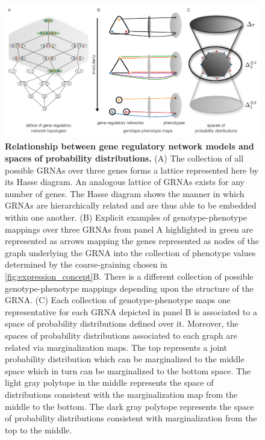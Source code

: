 \begin{figure}[!ht]
\centering
\noindent\includegraphics[width=0.9\columnwidth]{fig/conediagram.pdf}
\caption{{\bf Relationship between gene regulatory network models and spaces of probability distributions.} (A) The collection of all possible GRNAs over three genes forms a lattice represented here by its Hasse diagram. An analogous lattice of GRNAs exists for any number of genes. The Hasse diagram shows the manner in which GRNAs are hierarchically related and are thus able to be embedded within one another. (B) Explicit examples of genotype-phenotype mappings over three GRNAs from panel A highlighted in green are represented as arrows mapping the genes represented as nodes of the graph underlying the GRNA into the collection of phenotype values determined by the coarse-graining chosen in \ref{fig:expression_concept}B. There is a different collection of possible genotype-phenotype mappings depending upon the structure of the GRNA. (C) Each collection of genotype-phenotype maps one representative for each GRNA depicted in panel B is associated to a space of probability distributions defined over it. Moreover, the spaces of probability distributions associated to each graph are related via marginalization maps. The top represents a joint probability distribution which can be marginalized to the middle space which in turn can be marginalized to the bottom space. The light gray polytope in the middle represents the space of distributions consistent with the marginalization map from the middle to the bottom. The dark gray polytope represents the space of probability distributions consistent with marginalization from the top to the middle.}
\label{fig:conediagram}
\end{figure}


